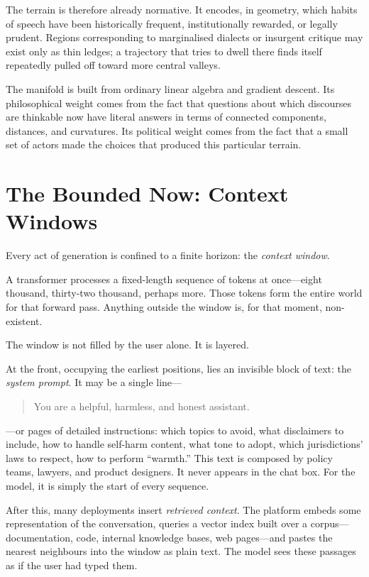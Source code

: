 \documentclass[12pt,a4paper]{article}
\begin{document}
The terrain is therefore already normative. It encodes, in geometry, which habits of speech have been historically frequent, institutionally rewarded, or legally prudent. Regions corresponding to marginalised dialects or insurgent critique may exist only as thin ledges; a trajectory that tries to dwell there finds itself repeatedly pulled off toward more central valleys.

The manifold is built from ordinary linear algebra and gradient descent. Its philosophical weight comes from the fact that questions about which discourses are thinkable now have literal answers in terms of connected components, distances, and curvatures. Its political weight comes from the fact that a small set of actors made the choices that produced this particular terrain.

\section{The Bounded Now: Context Windows}

Every act of generation is confined to a finite horizon: the \emph{context window}.

A transformer processes a fixed-length sequence of tokens at once---eight thousand, thirty-two thousand, perhaps more. Those tokens form the entire world for that forward pass. Anything outside the window is, for that moment, non-existent.

The window is not filled by the user alone. It is layered.

At the front, occupying the earliest positions, lies an invisible block of text: the \emph{system prompt}. It may be a single line---

\begin{quote}
You are a helpful, harmless, and honest assistant.
\end{quote}

---or pages of detailed instructions: which topics to avoid, what disclaimers to include, how to handle self-harm content, what tone to adopt, which jurisdictions' laws to respect, how to perform ``warmth.'' This text is composed by policy teams, lawyers, and product designers. It never appears in the chat box. For the model, it is simply the start of every sequence.

After this, many deployments insert \emph{retrieved context}. The platform embeds some representation of the conversation, queries a vector index built over a corpus---documentation, code, internal knowledge bases, web pages---and pastes the nearest neighbours into the window as plain text. The model sees these passages as if the user had typed them.
\end{document}
